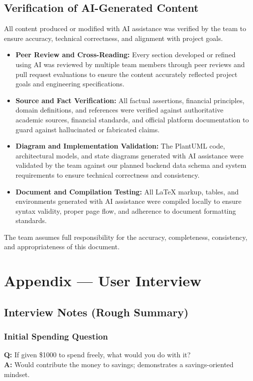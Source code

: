 \documentclass[12pt]{article}
\begin{document}
\subsection{Verification of AI-Generated Content}

All content produced or modified with AI assistance was verified by the team to ensure accuracy, technical correctness, and alignment with project goals. 
\begin{itemize}
    \item \textbf{Peer Review and Cross-Reading:} Every section developed or
    refined using AI was reviewed by multiple team members through peer reviews
    and pull request evaluations to ensure the content accurately reflected
    project goals and engineering specifications.
    \item \textbf{Source and Fact Verification:} All factual assertions,
    financial principles, domain definitions, and references were verified
    against authoritative academic sources, financial standards, and official
    platform documentation to guard against hallucinated or fabricated claims.
    \item \textbf{Diagram and Implementation Validation:} The PlantUML code,
    architectural models, and state diagrams generated with AI assistance were validated by the team
    against our planned backend data schema and system requirements to ensure
    technical correctness and consistency.
    \item \textbf{Document and Compilation Testing:} All LaTeX markup,
    tables, and environments generated with AI assistance were compiled locally
    to ensure syntax validity, proper page flow, and adherence to document
    formatting standards.
\end{itemize}
The team assumes full responsibility for the accuracy, completeness,
consistency, and appropriateness of this document.


\newpage{}

\section{Appendix --- User Interview}
\subsection*{Interview Notes (Rough Summary)}

\subsubsection*{Initial Spending Question}
\textbf{Q:} If given \$1000 to spend freely, what would you do with it? \\
\textbf{A:} Would contribute the money to savings; demonstrates a savings-oriented mindset.
\end{document}
